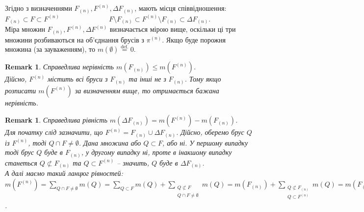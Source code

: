 \documentclass[a4paper, 10pt]{article}
\theoremstyle{theoremdd}
\theoremstyle{theoremdd}
\theoremstyle{theoremdd}
\theoremstyle{theoremdd}
\theoremstyle{theoremdd}
\theoremstyle{theoremdd}
\theoremstyle{theoremdd}
\theoremstyle{theoremdd}
\theoremstyle{theoremdd}
\theoremstyle{theoremdd}
\theoremstyle{theoremdd}
\newtheorem{remark}[theorem]{Remark}
\theoremstyle{theoremdd}
\theoremstyle{theoremdd}
\theoremstyle{theoremdd}
\theoremstyle{theoremdd}
\begin{document}
Згідно з визначеннями $F_{(n)},F^{(n)}, \Delta F_{(n)}$, мають місця співвідношення:\\
$F_{(n)} \subset F \subset F^{(n)} \hspace{3cm} F \setminus F_{(n)} \subset F^{(n)} \setminus F_{(n)} \subset \Delta F_{(n)}$.\\
\iffalse
Перший ланцюг вкладень цілком зрозумілий. У другому ланцюгу перше вкладення зліва також зрозуміле. Залишилося останнє.\\
Якщо $x \in F^{(n)} \setminus F_{(n)}$, то $x$ потрапляє в брус $Q$, який має спільну точку з $F$, проте не лежить всередині $F$. Таким чином, $Q \subset F^{(n)}$ та $Q \not\subset F_{(n)}$, тож звідси $x \in \Delta F_{(n)}$. Зворотна сторона не працює за щойним зауваженням.\\
\fi
Міра множин $F_{(n)}, F^{(n)}, \Delta F^{(n)}$ визначається мірою вище, оскільки ці три множини розбиваються на об'єднання брусів з $\pi^{(n)}$. Якщо буде порожня множина (за зауваженням), то $m(\emptyset) \overset{\text{def.}}{=} 0$.

\begin{remark}
Справедлива нерівність $m(F_{(n)}) \leq m(F^{(n)})$.\\
Дійсно, $F^{(n)}$ містить всі бруси з $F_{(n)}$ та інші не з $F_{(n)}$. Тому якщо розписати $m(F^{(n)})$ за визначенням вище, то отримається бажана нерівність.
\end{remark}

\begin{remark}
Справедлива рівність $m(\Delta F_{(n)}) = m(F^{(n)}) - m(F_{(n)})$. \\
Для початку слід зазначити, що $F^{(n)} = F_{(n)} \cup \Delta F_{(n)}$. Дійсно, оберемо брус $Q$ із $F^{(n)}$, тоді $Q \cap F \neq \emptyset$. Дана множина або $Q \subset F$, або ні. У першому випадку тоді брус $Q$ буде в $F_{(n)}$, у другому випадку ні, проте в інакшому випадку станеться $Q \not\subset F_{(n)}$ та $Q \subset F^{(n)}$ -- значить, $Q$ буде в $\Delta F_{(n)}$.\\
А далі маємо такий ланцюг рівностей:\\
$m(F^{(n)}) = \displaystyle\sum_{Q \cap F \neq \emptyset} m(Q) = \sum_{Q \subset F} m(Q) + \sum_{\substack{Q \not\subset F \\ Q \cap F \neq \emptyset}} m(Q) = m(F_{(n)}) + \sum_{\substack{Q \not\subset F_{(n)} \\ Q \subset F^{(n)}}} m(Q) = m(F_{(n)}) + m(\Delta F_{(n)})$.
\end{remark}
\end{document}
